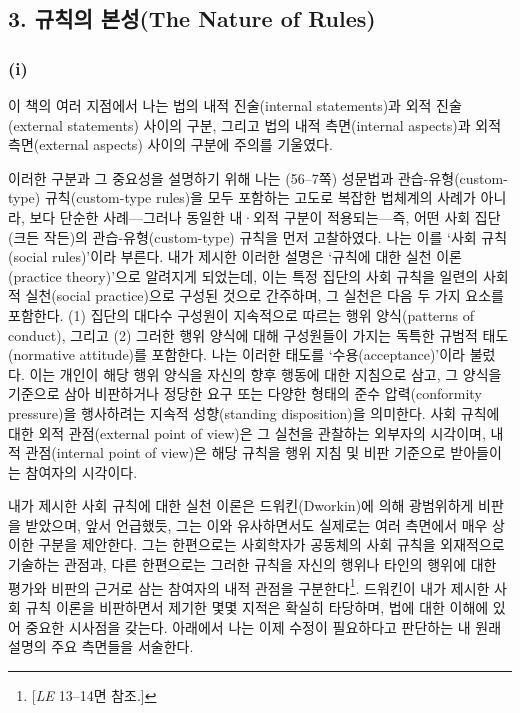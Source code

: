 \subsection{3. 규칙의 본성(The Nature of
Rules)}\label{uxaddcuxce59uxc758-uxbcf8uxc131the-nature-of-rules}

\subsubsection{\texorpdfstring{(i) }{(i) 규칙에 대한 실천 이론(The Practice Theory of Rules)}}\label{i-uxaddcuxce59uxc5d0-uxb300uxd55c-uxc2e4uxcc9c-uxc774uxb860the-practice-theory-of-rules}

이 책의 여러 지점에서 나는 법의 내적 진술(internal statements)과 외적
진술(external statements) 사이의 구분, 그리고 법의 내적 측면(internal
aspects)과 외적 측면(external aspects) 사이의 구분에 주의를 기울였다.

이러한 구분과 그 중요성을 설명하기 위해 나는 (56--7쪽) 성문법과
관습-유형(custom-type) 규칙(custom-type rules)을 모두 포함하는 고도로
복잡한 법체계의 사례가 아니라, 보다 단순한 사례---그러나 동일한 내·외적
구분이 적용되는---즉, 어떤 사회 집단(크든 작든)의 관습-유형(custom-type)
규칙을 먼저 고찰하였다. 나는 이를 `사회 규칙(social rules)'이라 부른다.
내가 제시한 이러한 설명은 `규칙에 대한 실천 이론(practice theory)'으로
알려지게 되었는데, 이는 특정 집단의 사회 규칙을 일련의 사회적
실천(social practice)으로 구성된 것으로 간주하며, 그 실천은 다음 두 가지
요소를 포함한다. (1) 집단의 대다수 구성원이 지속적으로 따르는 행위
양식(patterns of conduct), 그리고 (2) 그러한 행위 양식에 대해 구성원들이
가지는 독특한 규범적 태도(normative attitude)를 포함한다. 나는 이러한
태도를 `수용(acceptance)'이라 불렀다. 이는 개인이 해당 행위 양식을
자신의 향후 행동에 대한 지침으로 삼고, 그 양식을 기준으로 삼아
비판하거나 정당한 요구 또는 다양한 형태의 준수 압력(conformity
pressure)을 행사하려는 지속적 성향(standing disposition)을 의미한다.
사회 규칙에 대한 외적 관점(external point of view)은 그 실천을 관찰하는
외부자의 시각이며, 내적 관점(internal point of view)은 해당 규칙을 행위
지침 및 비판 기준으로 받아들이는 참여자의 시각이다.

내가 제시한 사회 규칙에 대한 실천 이론은 드워킨(Dworkin)에 의해
광범위하게 비판을 받았으며, 앞서 언급했듯, 그는 이와 유사하면서도
실제로는 여러 측면에서 매우 상이한 구분을 제안한다. 그는 한편으로는
사회학자가 공동체의 사회 규칙을 외재적으로 기술하는 관점과, 다른
한편으로는 그러한 규칙을 자신의 행위나 타인의 행위에 대한 평가와 비판의
근거로 삼는 참여자의 내적 관점을 구분한다\footnote{{[}\emph{LE} 13--14면
  참조.{]}}. 드워킨이 내가 제시한 사회 규칙 이론을 비판하면서 제기한
몇몇 지적은 확실히 타당하며, 법에 대한 이해에 있어 중요한 시사점을
갖는다. 아래에서 나는 이제 수정이 필요하다고 판단하는 내 원래 설명의
주요 측면들을 서술한다.

